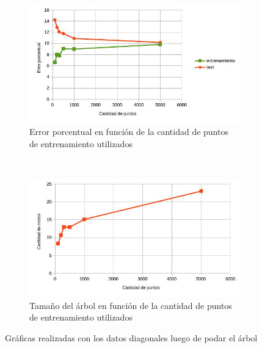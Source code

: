 \documentclass[12pt, a4paper]{article}
\begin{document}
\begin{figure}
    \centering

    \begin{subfigure}[b]{0.65\textwidth}
        \includegraphics[width=\textwidth]{errorAA}
        \caption{Error porcentual en función de la cantidad de puntos de entrenamiento utilizados}
    \end{subfigure}
      ~ %
    \begin{subfigure}[b]{0.65\textwidth}
        \includegraphics[width=\textwidth]{sizeAA}
        \caption{Tamaño del árbol en función de la cantidad de puntos de entrenamiento utilizados}
    \end{subfigure}
    \caption{Gráficas realizadas con los datos diagonales luego de podar el árbol}
\end{figure}
\end{document}
